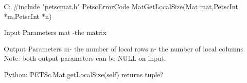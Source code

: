 C:
#include "petscmat.h"
PetscErrorCode MatGetLocalSize(Mat mat,PetscInt *m,PetscInt *n)

Input Parameters
mat -the matrix

Output Parameters
m- the number of local rows
n- the number of local columns
Note: both output parameters can be NULL on input.

Python:
PETSc.Mat.getLocalSize(self)
returns tuple?
